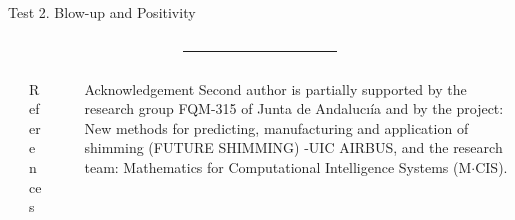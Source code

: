\documentclass[final]{beamer}
\newlength{\sepmargin}
\newlength{\sepwid}
\newlength{\onecolwid}
\begin{document}
\begin{frame}[t]
\begin{columns}[t]
\begin{column}{\onecolwid}
      \vspace{0.2cm}

      \begin{block}{Test 2. Blow-up and Positivity}
      \end{block}

    \end{column}

    \begin{column}{\sepmargin} \end{column}
  \end{columns}



  \vspace*{0.5cm}
  \begin{columns}[t]
    \begin{column}{\sepmargin}\end{column}
    \begin{column}{0.97\linewidth}
      {\color{blueMUW}\rule{1.012\textwidth}{10pt}}
    \end{column}
    \begin{column}{\sepmargin}\end{column}
  \end{columns}

  \vspace*{-1cm}
  \begin{columns}[t] %

    \begin{column}{\sepmargin} \end{column}
    \begin{column}{\onecolwid}
      \begin{block}{\large References}
        \vspace*{-0.5cm}
        \nocite{*} %
        {\footnotesize
          }
      \end{block}
    \end{column} %
    \begin{column}{\sepwid}  \end{column}

    \begin{column}{\onecolwid}
      \begin{block}{\large Acknowledgement}
        \vspace*{-0.5cm}
        \footnotesize Second author is partially supported by the research group FQM-315 of Junta de Andalucı\'ia and by the project: New methods for predicting, manufacturing and application of shimming (FUTURE SHIMMING) -UIC AIRBUS, and the research team: Mathematics for Computational Intelligence Systems (M$\cdot$CIS).
      \end{block}
      \vspace*{-0.5cm}


\end{column}
\end{columns}
\end{frame}
\end{document}
